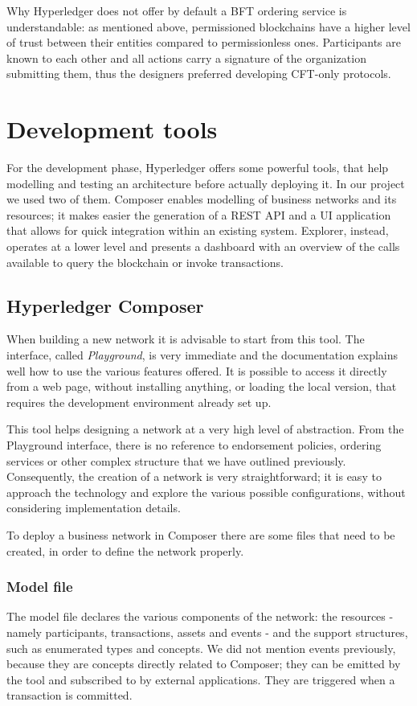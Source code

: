 Why Hyperledger does not offer by default a BFT ordering service is understandable: as mentioned above, permissioned blockchains have a higher level of trust between their  entities compared to permissionless ones. Participants are known to each other and all actions carry a signature of the organization submitting them, thus the designers preferred developing CFT-only protocols. 

\section{Development tools}
\label{sec:dev_tools}
For the development phase, Hyperledger offers some powerful tools, that help modelling and testing an architecture before actually deploying it. In our project we used two of them. Composer enables modelling of business networks and its resources; it makes easier the generation of a REST API and a UI application that allows for quick integration within an existing system. Explorer, instead, operates at a lower level and presents a dashboard with an overview of the calls available to query the blockchain or invoke transactions.

\subsection{Hyperledger Composer}
\label{sec:composer}
When building a new network it is advisable to start from this tool. The interface, called \emph{Playground}, is very immediate and the documentation explains well how to use the various features offered. It is possible to access it directly from a web page, without installing anything, or loading the local version, that requires the development environment already set up. 

This tool helps designing a network at a very high level of abstraction. From the Playground interface, there is no reference to endorsement policies, ordering services or other complex structure that we have outlined previously. Consequently, the creation of a network is very straightforward; it is easy to approach the technology and explore the various possible configurations, without considering implementation details. 

To deploy a business network in Composer there are some files that need to be created, in order to define the network properly.

\subsubsection{Model file}
The model file declares the various components of the network: the resources - namely participants, transactions, assets and events - and the support structures, such as enumerated types and concepts. We did not mention events previously, because they are concepts directly related to Composer; they can be emitted by the tool and subscribed to by external applications. They are triggered when a transaction is committed.

